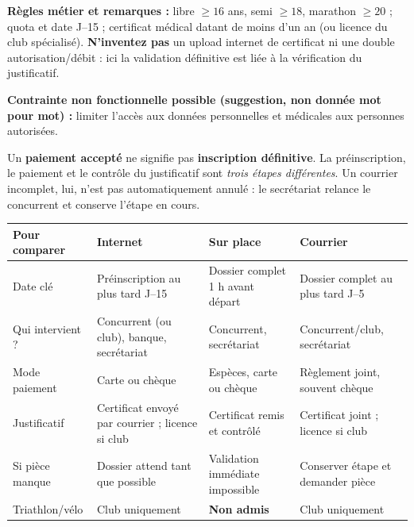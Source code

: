 \textbf{Règles métier et remarques :} libre \(\geq16\) ans, semi \(\geq18\), marathon \(\geq20\) ; quota et date J--15 ; certificat médical datant de moins d'un an (ou licence du club spécialisé). \textbf{N'inventez pas} un upload internet de certificat ni une double autorisation/débit : ici la validation définitive est liée à la vérification du justificatif.\par
\textbf{Contrainte non fonctionnelle possible (suggestion, non donnée mot pour mot) :} limiter l'accès aux données personnelles et médicales aux personnes autorisées.
\begin{warningbox}
Un \textbf{paiement accepté} ne signifie pas \textbf{inscription définitive}. La préinscription, le paiement et le contrôle du justificatif sont \emph{trois étapes différentes}. Un courrier incomplet, lui, n'est pas automatiquement annulé : le secrétariat relance le concurrent et conserve l'étape en cours.
\end{warningbox}
\begin{tabularx}{\linewidth}{@{}p{29mm}XXX@{}}
\toprule
Pour comparer & Internet & Sur place & Courrier \\
\midrule
Date clé & Préinscription au plus tard J--15 & Dossier complet 1 h avant départ & Dossier complet au plus tard J--5\\
Qui intervient ? & Concurrent (ou club), banque, secrétariat & Concurrent, secrétariat & Concurrent/club, secrétariat\\
Mode paiement & Carte ou chèque & Espèces, carte ou chèque & Règlement joint, souvent chèque\\
Justificatif & Certificat envoyé par courrier ; licence si club & Certificat remis et contrôlé & Certificat joint ; licence si club\\
Si pièce manque & Dossier attend tant que possible & Validation immédiate impossible & Conserver étape et demander pièce\\
Triathlon/vélo & Club uniquement & \textbf{Non admis} & Club uniquement\\
\bottomrule
\end{tabularx}

